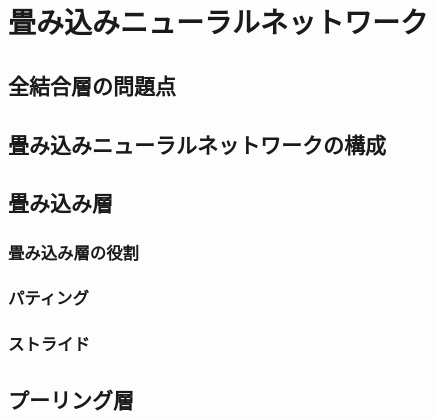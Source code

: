 
\chapter{畳み込みニューラルネットワーク}

\section{全結合層の問題点}

\section{畳み込みニューラルネットワークの構成}

\section{畳み込み層}

\subsection{畳み込み層の役割}

\subsection{パティング}

\subsection{ストライド}

\section{プーリング層}
